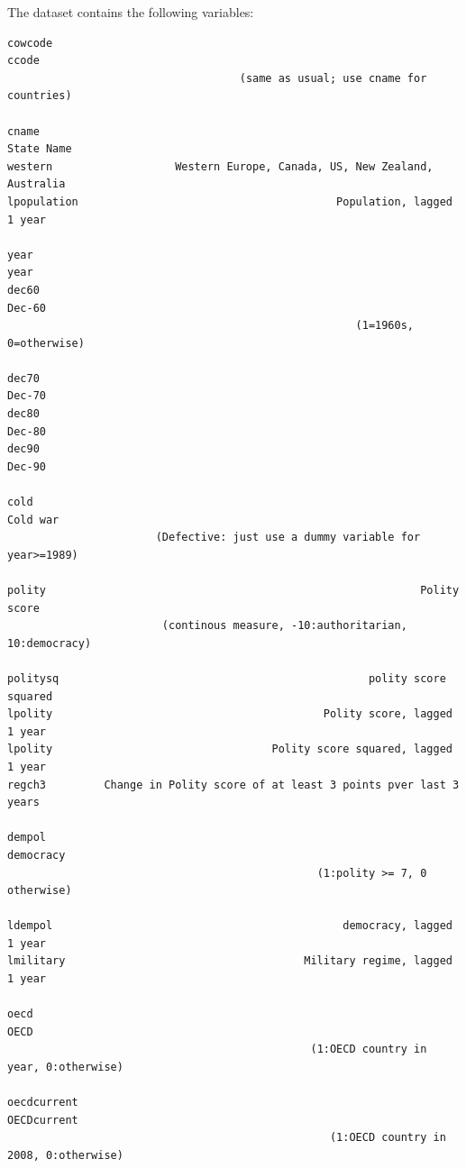 \documentclass[12pt]{article}
\begin{document}
The dataset contains the following variables:
\begin{verbatim}
cowcode                                                                ccode
                                    (same as usual; use cname for countries)
                                    
cname                                                             State Name
western                   Western Europe, Canada, US, New Zealand, Australia
lpopulation                                        Population, lagged 1 year

year                                                                    year
dec60                                                                 Dec-60
                                                      (1=1960s, 0=otherwise)
                                                         
dec70                                                                 Dec-70
dec80                                                                 Dec-80
dec90                                                                 Dec-90

cold                                                                Cold war
                       (Defective: just use a dummy variable for year>=1989)

polity                                                          Polity score
                        (continous measure, -10:authoritarian, 10:democracy)
                           
politysq                                                polity score squared
lpolity                                          Polity score, lagged 1 year
lpolity                                  Polity score squared, lagged 1 year
regch3         Change in Polity score of at least 3 points pver last 3 years

dempol                                                             democracy
                                                (1:polity >= 7, 0 otherwise)

ldempol                                             democracy, lagged 1 year
lmilitary                                     Military regime, lagged 1 year

oecd                                                                    OECD
                                               (1:OECD country in year, 0:otherwise)

oecdcurrent                                                      OECDcurrent
                                                  (1:OECD country in 2008, 0:otherwise)


\end{verbatim}
\end{document}
